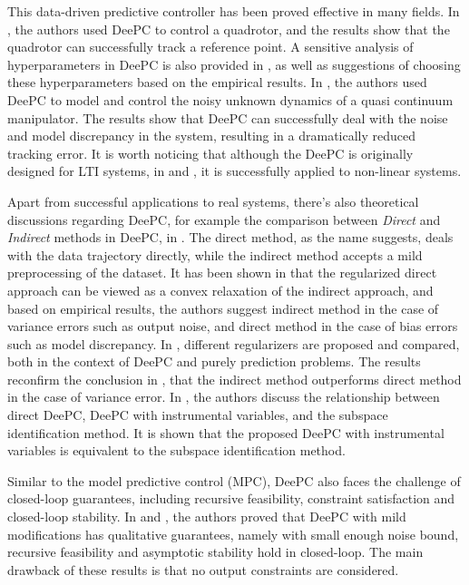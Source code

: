 This data-driven predictive controller has been proved effective in many fields.
In \cite{elokdaDataQuad2021}, the authors used DeePC to control a quadrotor, and the results show that the quadrotor can successfully track a reference point.
A sensitive analysis of hyperparameters in DeePC is also provided in \cite{elokdaDataQuad2021}, as well as suggestions of choosing these hyperparameters based on the empirical results.
In \cite{mullerDataDrivenQCR2022}, the authors used DeePC to model and control the noisy unknown dynamics of a quasi continuum manipulator.
The results show that DeePC can successfully deal with the noise and model discrepancy in the system, resulting in a dramatically reduced tracking error.
It is worth noticing that although the DeePC is originally designed for LTI systems, in \cite{elokdaDataQuad2021} and \cite{mullerDataDrivenQCR2022}, it is successfully applied to non-linear systems.

Apart from successful applications to real systems, there's also theoretical discussions regarding DeePC, for example the comparison between \emph{Direct} and \emph{Indirect} methods in DeePC, in \cite{dorflerBridgingDirectIndirect2023}.
The direct method, as the name suggests, deals with the data trajectory directly, while the indirect method accepts a mild preprocessing of the dataset.
It has been shown in \cite{dorflerBridgingDirectIndirect2023} that the regularized direct approach can be viewed as a convex relaxation of the indirect approach, and based on empirical results, the authors suggest indirect method in the case of variance errors such as output noise, and direct method in the case of bias errors such as model discrepancy.
In \cite{mattssonRegularizationDeePC}, different regularizers are proposed and compared, both in the context of DeePC and purely prediction problems.
The results reconfirm the conclusion in \cite{dorflerBridgingDirectIndirect2023}, that the indirect method outperforms direct method in the case of variance error.
In \cite{vanwingerdenInstrumentVar2022}, the authors discuss the relationship between direct DeePC, DeePC with instrumental variables, and the subspace identification method.
It is shown that the proposed DeePC with instrumental variables is equivalent to the subspace identification method.

Similar to the model predictive control (MPC), DeePC also faces the challenge of closed-loop guarantees, including recursive feasibility, constraint satisfaction and closed-loop stability.
In \cite{berberichDataDrivenRobust2021} and \cite{berberichStabilityInnerRobust2022IEEE}, the authors proved that DeePC with mild modifications has qualitative guarantees, namely with small enough noise bound, recursive feasibility and asymptotic stability hold in closed-loop.
The main drawback of these results is that no output constraints are considered.

